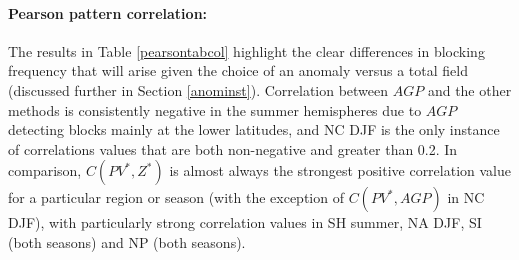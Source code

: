 \documentclass[smallextended]{svjour3}       %
\numberwithin{equation}{section}
\begin{document}
\paragraph{Pearson pattern correlation:} The results in Table \ref{pearsontabcol} highlight the clear differences in blocking frequency that will arise given the choice of an anomaly versus a total field (discussed further in Section \ref{anominst}). {\color{blue}Correlation between $AGP$ and the other methods is consistently negative in the summer hemispheres due to $AGP$ detecting blocks mainly at the lower latitudes, and NC DJF is the only instance of correlations values that are both non-negative and greater than 0.2. }In comparison, $C(PV^*, Z^*)$ is almost always the strongest positive correlation value for a particular region or season (with the exception of $C(PV^*, AGP)$ in NC DJF), with particularly strong correlation values in SH summer, NA DJF, SI (both seasons) and NP (both seasons).

\end{document}
